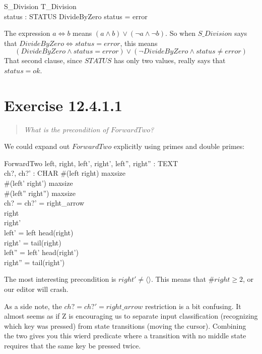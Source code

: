 \documentclass[10pt]{article}
\begin{document}
\begin{spec}
  \begin{schema}{S\_Division}
    T\_Division \\
    status : STATUS
    \where
    DivideByZero \iff status = error
  \end{schema}
\end{spec}
The expression $a \iff b$ means $(a \land b) \lor (\lnot a \land \lnot b)$.  So when $S\_Division$
says that $DivideByZero \iff status = error$, this means
\[ (DivideByZero \land status = error) \lor
   (\lnot DivideByZero \land status \neq error) \]
That second clause, since $STATUS$ has only two values, really says that $status = ok$.


\section{Exercise 12.4.1.1}
\begin{quote}
  {\it
   What is the precondition of $ForwardTwo$? 
  }
\end{quote}

We could expand out $ForwardTwo$ explicitly using primes and double primes:

\begin{spec}
  \begin{schema}{ForwardTwo}
    left, right, left', right', left'', right'' : TEXT \\
    ch?, ch?' : CHAR \where
    \#(left \cat right) \leq maxsize\\
    \#(left' \cat right') \leq maxsize\\
    \#(left'' \cat right'') \leq maxsize\\
    ch? = ch?' = right\_arrow \\
    right \neq \langle \rangle \\
    right' \neq \langle \rangle \\
    left' = left \cat \langle head(right)\rangle \\
    right' = tail(right) \\
    left'' = left' \cat \langle head(right')\rangle \\
    right'' = tail(right') \\
  \end{schema}
\end{spec}
The most interesting precondition is $right' \neq \langle \rangle$.  This means that $\#right \geq
2$, or our editor will crash.

As a side note, the $ch? = ch?' = right\_arrow$ restriction is a bit confusing.  It almost seems as
if Z is encouraging us to separate input classification (recognizing which key was pressed) from
state transitions (moving the cursor).  Combining the two gives you this wierd predicate where a
transition with no middle state requires that the same key be pressed twice.
\end{document}
